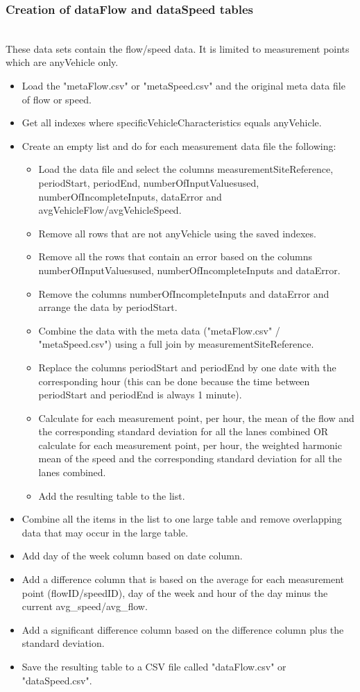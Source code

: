 \documentclass[sigconf]{acmart}
\begin{document}
\subsubsection{Creation of dataFlow and dataSpeed tables}\hspace*{\fill} \\
These data sets contain the flow/speed data. It is limited to measurement points which are anyVehicle only.
\begin{itemize}
    \item Load the "metaFlow.csv" or "metaSpeed.csv" and the original meta data file of flow or speed.
    \item Get all indexes where specificVehicleCharacteristics equals anyVehicle.
    \item Create an empty list and do for each measurement data file the following: \begin{itemize}
        \item Load the data file and select the columns measurementSiteReference, periodStart, periodEnd, numberOfInputValuesused, numberOfIncompleteInputs, dataError and avgVehicleFlow/avgVehicleSpeed.
        \item Remove all rows that are not anyVehicle using the saved indexes. 
        \item Remove all the rows that contain an error based on the columns numberOfInputValuesused, numberOfIncompleteInputs and dataError.
        \item Remove the columns numberOfIncompleteInputs and dataError and arrange the data by periodStart.
        \item Combine the data with the meta data ("metaFlow.csv" / "metaSpeed.csv") using a full join by measurementSiteReference.
        \item Replace the columns periodStart and periodEnd by one date with the corresponding hour (this can be done because the time between periodStart and periodEnd is always 1 minute).
        \item Calculate for each measurement point, per hour, the mean of the flow and the corresponding standard deviation for all the lanes combined OR calculate for each measurement point, per hour, the weighted harmonic mean of the speed and the corresponding standard deviation for all the lanes combined.
        \item Add the resulting table to the list.
    \end{itemize}
    \item Combine all the items in the list to one large table and remove overlapping data that may occur in the large table.
    \item Add day of the week column based on date column.
    \item Add a difference column that is based on the average for each measurement point (flowID/speedID), day of the week and hour of the day minus the current avg\_speed/avg\_flow.
    \item Add a significant difference column based on the difference column plus the standard deviation.
    \item Save the resulting table to a CSV file called "dataFlow.csv" or "dataSpeed.csv".
\end{itemize}
\end{document}
